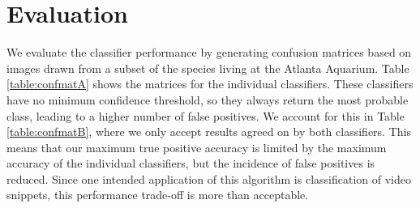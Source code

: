 \documentclass[10pt,twocolumn,letterpaper]{article}
\begin{document}
\section{Evaluation}
We evaluate the classifier performance by generating confusion matrices based on images drawn from a subset of the species living at the Atlanta Aquarium. Table \ref{table:confmatA} shows the matrices for the individual classifiers. These classifiers have no minimum confidence threshold, so they always return the most probable class, leading to a higher number of false positives. We account for this in Table \ref{table:confmatB}, where we only accept results agreed on by both classifiers. This means that our maximum true positive accuracy is limited by the maximum accuracy of the individual classifiers, but the incidence of false positives is reduced. Since one intended application of this algorithm is classification of video snippets, this performance trade-off is more than acceptable.
\end{document}
